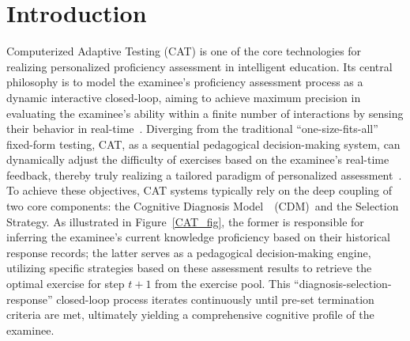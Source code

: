 \section{Introduction}

Computerized Adaptive Testing (CAT) is one of the core technologies for realizing personalized proficiency assessment in intelligent education. Its central philosophy is to model the examinee's proficiency assessment process as a dynamic interactive closed-loop, aiming to achieve maximum precision in evaluating the examinee's ability within a finite number of interactions by sensing their behavior in real-time~\cite{bi2024model}. Diverging from the traditional ``one-size-fits-all'' fixed-form testing, CAT, as a sequential pedagogical decision-making system, can dynamically adjust the difficulty of exercises based on the examinee's real-time feedback, thereby truly realizing a tailored paradigm of personalized assessment~\cite{zhuang2026survey}. To achieve these objectives, CAT systems typically rely on the deep coupling of two core components: the Cognitive Diagnosis Model~\cite{guodiagnosis}~(CDM)~and the Selection Strategy. As illustrated in Figure~\ref{CAT_fig}, the former is responsible for inferring the examinee's current knowledge proficiency based on their historical response records; the latter serves as a pedagogical decision-making engine, utilizing specific strategies based on these assessment results to retrieve the optimal exercise for step $t+1$ from the exercise pool. This ``diagnosis-selection-response'' closed-loop process iterates continuously until pre-set termination criteria are met, ultimately yielding a comprehensive cognitive profile of the examinee.



